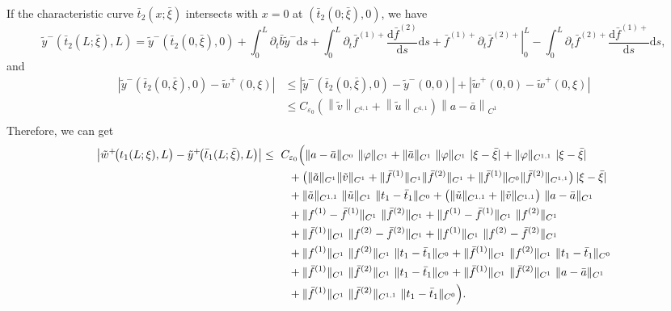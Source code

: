 \documentclass[a4paper,reqno,11pt]{amsart}
\numberwithin{equation}{section} %
\begin{document}
If the characteristic curve $\bar{t} _2(x;\bar{\xi}  )$ intersects with $x=0$ at $(\bar{t}_2(0;\bar{\xi} ),0)$, we have
$$
\tilde{y}^-\left( \bar{t}_2(L;\bar{\xi}),L \right) =\tilde{y}^-(\bar{t}_2(0,\bar{\xi}),0)+\int_0^L{\partial _t\bar{b}\tilde{y}^-\mathrm{d}s}+\int_0^L{\partial _t\bar{f}^{(1)+}\frac{\mathrm{d}\bar{f}^{(2)}}{\mathrm{d}s}\mathrm{d}s}+\left. \bar{f}^{(1)+}\partial _t\bar{f}^{(2)+} \right|_{0}^{L}-\int_0^L{\partial _t{\bar{f}}^{(2)+}\frac{\mathrm{d}{\bar{f}}^{(1)+}}{\mathrm{d}s}\mathrm{d}s},
$$
and
$$
\begin{aligned}
	\left| \tilde{y}^-(\bar{t}_2(0,\bar{\xi}),0)-\tilde{w}^+(0,\xi ) \right|&\le \left| \tilde{y}^-(\bar{t}_2(0,\bar{\xi}),0)-\tilde{y}^-(0,0) \right|+\left| \tilde{w}^+(0,0)-\tilde{w}^+(0,\xi ) \right|\\
	&\le C_{\varepsilon _0}\left( \left\| \tilde{v} \right\| _{C^{1,1}}+\left\| \tilde{u} \right\| _{C^{1,1}} \right) \left\| a-\bar{a} \right\| _{C^1}\\
\end{aligned}
$$
Therefore, we can get
\[
\begin{aligned}
\bigl|\tilde w^+\!\bigl(t_1(L;\xi),L\bigr)-\tilde y ^+\!\bigl(\bar t_1(L;\bar\xi),L\bigr)\bigr|
\le{}&\ C_{\varepsilon_0}\Bigl(
  \|a-\bar a\|_{C^{0}}\ \|\varphi\|_{C^{1}}
  + \|\bar a\|_{C^{1}}\ \|\varphi\|_{C^{1}}\ |\xi-\bar\xi|
  + \|\varphi\|_{C^{1,1}}\ |\xi-\bar\xi|
\\
&\quad
  + \bigl(\|\tilde a\|_{C^{1}}\|\tilde v\|_{C^{1}}
     + \|\bar f^{(1)}\|_{C^{1}}\|\bar f^{(2)}\|_{C^{1}}
     + \|\bar f^{(1)}\|_{C^{0}}\|\bar f^{(2)}\|_{C^{1,1}}\bigr)\,|\xi-\bar\xi|
\\
&\quad
  + \|\tilde a\|_{C^{1,1}}\ \|\tilde u\|_{C^{1}}\ \|t_1-\bar t_1\|_{C^{0}}
  + \bigl(\|\tilde u\|_{C^{1,1}}+\|\tilde v\|_{C^{1,1}}\bigr)\ \|a-\bar a\|_{C^{1}}
\\
&\quad
  + \|f^{(1)}-\bar f^{(1)}\|_{C^{1}}\ \|\bar f^{(2)}\|_{C^{1}}
  + \|f^{(1)}-\bar f^{(1)}\|_{C^{1}}\ \|f^{(2)}\|_{C^{1}}
\\
&\quad
  + \|\bar f^{(1)}\|_{C^{1}}\ \|f^{(2)}-\bar f^{(2)}\|_{C^{1}}
  + \|f^{(1)}\|_{C^{1}}\ \|f^{(2)}-\bar f^{(2)}\|_{C^{1}}
\\
&\quad
  + \|f^{(1)}\|_{C^{1}}\ \|f^{(2)}\|_{C^{1}}\ \|t_1-\bar t_1\|_{C^{0}}
  + \|\bar f^{(1)}\|_{C^{1}}\ \|f^{(2)}\|_{C^{1}}\ \|t_1-\bar t_1\|_{C^{0}}
\\
&\quad
  + \|\bar f^{(1)}\|_{C^{1}}\ \|\bar f^{(2)}\|_{C^{1}}\ \|t_1-\bar t_1\|_{C^{0}}
  + \|\bar f^{(1)}\|_{C^{1}}\ \|\bar f^{(2)}\|_{C^{1}}\ \|a-\bar a\|_{C^{1}}
\\
&\quad
  + \|\bar f^{(1)}\|_{C^{1}}\ \|\bar f^{(2)}\|_{C^{1,1}}\ \|t_1-\bar t_1\|_{C^{0}}
\Bigr).
\end{aligned}
\]
\end{document}

